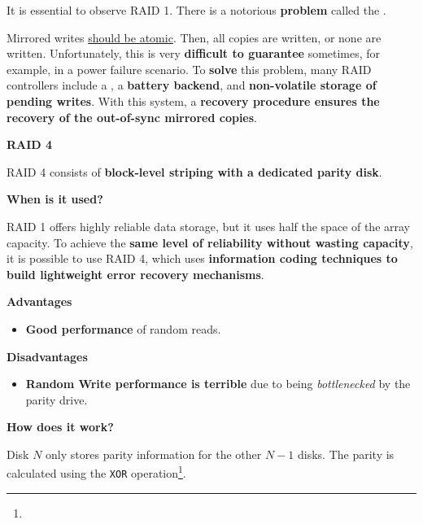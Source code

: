 \highspace
It is essential to observe RAID 1. There is a notorious \textbf{problem} called the .

Mirrored writes \underline{should be atomic}. Then, all copies are written, or none are written. Unfortunately, this is very \textbf{difficult to guarantee} sometimes, for example, in a power failure scenario. To \textbf{solve} this problem, many RAID controllers include a , a \textbf{battery backend}, and \textbf{non-volatile storage of pending writes}. With this system, a \textbf{recovery procedure ensures the recovery of the out-of-sync mirrored copies}.

\newpage

\begin{center}\label{RAID 4}
    \large
    \hypertarget{RAID 4}{\textcolor{Red2}{\textbf{RAID 4}}}
\end{center}

\noindent
RAID 4 consists of \textbf{block-level striping with a dedicated parity disk}.

\begin{flushleft}
    \textcolor{Green3}{ \textbf{When is it used?}}
\end{flushleft}
RAID 1 offers highly reliable data storage, but it uses half the space of the array capacity. To achieve the \textbf{same level of reliability without wasting capacity}, it is possible to use RAID 4, which uses \textbf{information coding techniques to build lightweight error recovery mechanisms}.

\highspace
\begin{flushleft}
    \textcolor{Green3}{ \textbf{Advantages}}
\end{flushleft}
\begin{itemize}
    \item \textbf{Good performance} of random reads.
\end{itemize}

\highspace
\begin{flushleft}
    \textcolor{Red2}{ \textbf{Disadvantages}}
\end{flushleft}
\begin{itemize}
    \item \textbf{Random Write performance is terrible} due to being \emph{bottlenecked} by the parity drive.
\end{itemize}

\highspace
\begin{flushleft}
    \textcolor{Green3}{ \textbf{How does it work?}}
\end{flushleft}
Disk $N$ only stores parity information for the other $N-1$ disks. The parity is calculated using the \texttt{XOR} operation\footnote{}.


